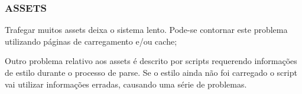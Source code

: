 \subsubsection{ASSETS}

Trafegar muitos assets deixa o sistema lento. Pode-se contornar este
problema utilizando páginas de carregamento e/ou cache;

Outro problema relativo aos assets é descrito por \cite{howBrowsersWork}
scripts requerendo informações de estilo durante o processo de
parse. Se o estilo ainda não foi carregado o script vai utilizar
informações erradas, causando uma série de problemas.

